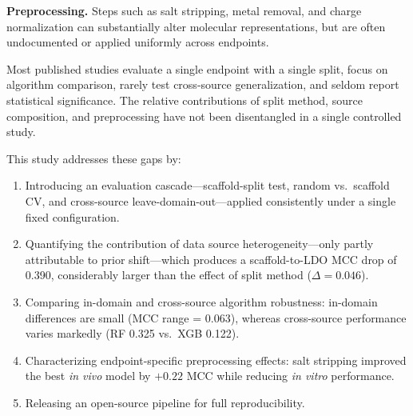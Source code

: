 \textbf{Preprocessing.} Steps such as salt stripping, metal removal, and charge
normalization can substantially alter molecular
representations,\cite{Fourches_2010,Fourches_2016} but are often undocumented or applied
uniformly across endpoints.

Most published studies evaluate a single endpoint with a single split, focus on algorithm
comparison,\cite{Yang_2019,Mayr_2016} rarely test cross-source generalization, and seldom
report statistical significance.\cite{Demsar_2006} The relative contributions of split
method, source composition, and preprocessing have not been disentangled in a single
controlled study.

This study addresses these gaps by:
\begin{enumerate}
    \item Introducing an evaluation cascade---scaffold-split test, random vs.\ scaffold CV,
    and cross-source leave-domain-out---applied consistently under a single fixed
    configuration.

    \item Quantifying the contribution of data source heterogeneity---only partly
    attributable to prior shift---which produces a scaffold-to-LDO MCC drop of 0.390,
    considerably larger than the effect of split method
    ($\Delta = 0.046$).

    \item Comparing in-domain and cross-source algorithm robustness: in-domain differences
    are small (MCC range = 0.063), whereas cross-source performance varies markedly
    (RF 0.325 vs.\ XGB 0.122).

    \item Characterizing endpoint-specific preprocessing effects: salt stripping improved
    the best \textit{in vivo} model by $+0.22$ MCC while reducing \textit{in vitro} performance.

    \item Releasing an open-source pipeline for full reproducibility.
\end{enumerate}
